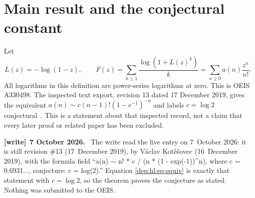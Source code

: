 \documentclass[11pt]{article}
\theoremstyle{definition}\newtheorem{definition}[theorem]{Definition}
\theoremstyle{remark}\newtheorem{remark}[theorem]{Remark}
\newenvironment{writenote}[1][]{\par\smallskip\begingroup\small
 \noindent\textbf{[write]}\if\relax\detokenize{#1}\relax\else~\textbf{#1.}\fi\ }%
 {\par\endgroup\smallskip}
\begin{document}
\section{Main result and the conjectural constant}\label{dep:hl:sec:main}
Let
\begin{equation}\label{dep:hl:eq:def}
 L(z)=-\log(1-z),\qquad
 F(z)=\sum_{k\ge1}\frac{\log(1+L(z)^k)}{k}
     =\sum_{n\ge0}a(n)\frac{z^n}{n!}.
\end{equation}
All logarithms in this definition are power-series logarithms at zero.
This is OEIS A330498. The inspected text export, revision 13 dated
17 December 2019, gives the equivalent
$a(n)\sim c(n-1)!(1-e^{-1})^{-n}$ and labels $c=\log 2$
conjectural~\cite{oeisA330498}. This is a statement about that inspected record,
not a claim that every later proof or related paper has been excluded.

\begin{writenote}[7 October 2026]
The write read the live entry on 7~October 2026: it is still revision \#13 (17~December 2019), by V\'aclav Kot\v{e}\v{s}ovec (16~December 2019), with the formula field ``a(n) $\sim$ n! * c / (n * (1 - exp(-1))\^{}n), where c = 0.6931..., conjecture: c = log(2).'' Equation \eqref{dep:hl:eq:equiv} is exactly that statement with $c=\log2$, so the theorem proves the conjecture as stated. Nothing was submitted to the OEIS.
\end{writenote}
\end{document}
